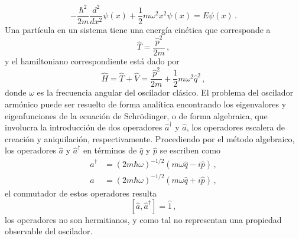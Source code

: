 \begin{equation}
  \label{OA.4}
  -\frac{\hbar^2}{2m}\frac{d^2}{dx^2}\psi(x) + \frac{1}{2}m \omega^2 x^2 \psi(x) = E \psi(x) \,.
\end{equation}
Una partícula en un sistema tiene una energía cinética que corresponde a
\begin{equation*}
  \hat{T} = \frac{\hat{p}^2}{2m}\,,
\end{equation*}
y el hamiltoniano correspondiente está dado por
\begin{equation}
  \hat{H} = \hat{T} + \hat{V} = \frac{\hat{p}^2}{2m} +\frac{1}{2} m\omega^2 \hat{q}^2 \label{OA.5}\,,
\end{equation}
donde $\omega$ es la frecuencia angular del oscilador clásico.
El problema del oscilador armónico puede ser resuelto de forma analítica encontrando los eigenvalores y eigenfunciones de la ecuación de Schrödinger, o de forma algebraica, que involucra la introducción de dos operadores $\hat{a}^{\dagger}$ y $\hat{a}$, los operadores escalera de creación y aniquilación, respectivamente. Procediendo por el método algebraico, los operadores $\hat{a}$ y $\hat{a}^\dagger$ en términos de $\hat{q}$ y $\hat{p}$ se escriben como
\begin{align} %
  \hat{a}^{\dagger} & = (2m\hbar\omega)^{-1/2}(m\omega \hat{q} - i\hat{p})\label{OA.6} \,,   \\
  \hat{a}           & = (2m\hbar \omega)^{-1/2}(m\omega \hat{q} + i \hat{p})\label{OA.7} \,,
\end{align}
el conmutador de estos operadores resulta
\begin{equation}
  \label{OA.8}
  [\hat{a}, \hat{a}^{\dagger}] = \hat{1} \,,
\end{equation}
los operadores no son hermitianos, y como tal no representan una propiedad observable del oscilador. %

